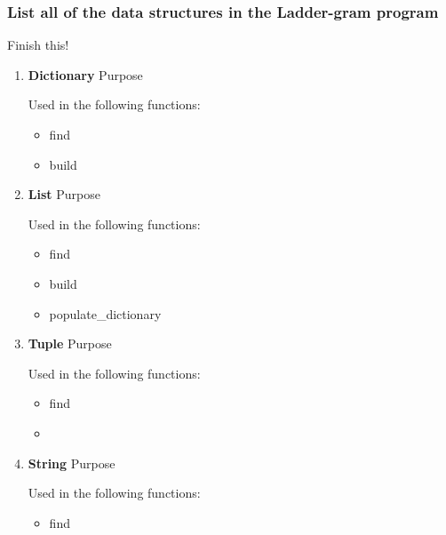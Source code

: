 \documentclass[12pt, a4]{report}
\begin{document}

	
	\subsubsection{List all of the data structures in the Ladder-gram program}
		\par Finish this!
		\begin{enumerate}
				\item
					\textbf{Dictionary}
					\textbar{} Purpose
					\par Used in the following functions:
					\begin{itemize}
						\item find
						\item build
					\end{itemize}
				\item
					\textbf{List}
					\textbar{} Purpose
					\par Used in the following functions:
					\begin{itemize}
						\item find
						\item build
						\item populate\_dictionary
					\end{itemize}
				\item
					\textbf{Tuple}
					\textbar{} Purpose
					\par Used in the following functions:
					\begin{itemize}
						\item find
						\item 
					\end{itemize}
				\item
					\textbf{String}
					\textbar{} Purpose
					\par Used in the following functions:
					\begin{itemize}
						\item find
					\end{itemize}
		\end{enumerate}
	
\end{document}
